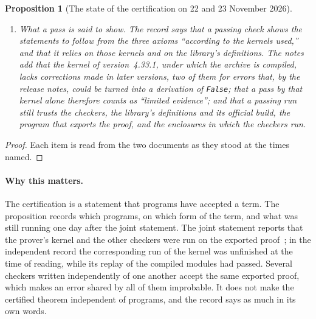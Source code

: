\documentclass[11pt]{article}
\newtheorem{proposition}[theorem]{Proposition}
\theoremstyle{definition}
\theoremstyle{remark}
\DeclareRobustCommand{\lean}[1]{{\renewcommand{\_}{\textunderscore\allowbreak}\texttt{#1}}}
\newcommand{\False}{\lean{False}}
\begin{document}
\begin{proposition}[The state of the certification on 22 and 23 November 2026]
\begin{enumerate}[leftmargin=2em,itemsep=1pt]
\item \emph{What a pass is said to show.} The record says that a passing check shows the statements to follow from the three axioms ``according to the kernels used,'' and that it relies on those kernels and on the library's definitions. The notes add that the kernel of version~4.33.1, under which the archive is compiled, lacks corrections made in later versions, two of them for errors that, by the release notes, could be turned into a derivation of \False; that a pass by that kernel alone therefore counts as ``limited evidence''; and that a passing run still trusts the checkers, the library's definitions and its official build, the program that exports the proof, and the enclosures in which the checkers run.
\end{enumerate}
\end{proposition}

\begin{proof}
Each item is read from the two documents as they stood at the times named.
\end{proof}

\paragraph{Why this matters.} The certification is a statement that programs have accepted a term. The proposition records which programs, on which form of the term, and what was still running one day after the joint statement. The joint statement reports that the prover's kernel and the other checkers were run on the exported proof~\citep{leanblog}; in the independent record the corresponding run of the kernel was unfinished at the time of reading, while its replay of the compiled modules had passed. Several checkers written independently of one another accept the same exported proof, which makes an error shared by all of them improbable. It does not make the certified theorem independent of programs, and the record says as much in its own words.
\end{document}
